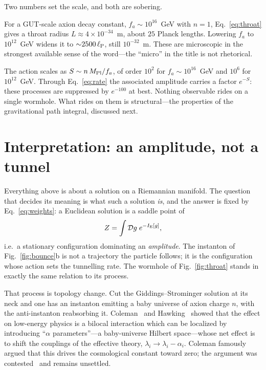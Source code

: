 \documentclass[twocolumn,floatfix,aps,prd,nofootinbib]{revtex4-2}
\begin{document}
Two numbers set the scale, and both are sobering.

For a GUT-scale axion decay constant, $f_a\sim10^{16}$~GeV with $n=1$, Eq.~\eqref{eq:throat} gives a throat radius $L\approx4\times10^{-34}$~m, about $25$ Planck lengths. Lowering $f_a$ to $10^{12}$~GeV widens it to ${\sim}2500\,\ell_{\rm P}$, still $10^{-32}$~m. These are microscopic in the strongest available sense of the word---the ``micro'' in the title is not rhetorical.

The action scales as $S\sim n\,M_{\rm Pl}/f_a$, of order $10^2$ for $f_a\sim10^{16}$~GeV and $10^6$ for $10^{12}$~GeV. Through Eq.~\eqref{eq:rate} the associated amplitude carries a factor $e^{-S}$: these processes are suppressed by $e^{-100}$ at best. Nothing observable rides on a single wormhole. What rides on them is structural---the properties of the gravitational path integral, discussed next.

\section{Interpretation: an amplitude, not a tunnel}
\label{sec:interpretation}

Everything above is about a solution on a Riemannian manifold. The question that decides its meaning is what such a solution \emph{is}, and the answer is fixed by Eq.~\eqref{eq:weights}: a Euclidean solution is a saddle point of
\begin{equation}
Z=\int\mathcal{D}g\;e^{-I_{\rm E}[g]} ,
\label{eq:pathintegral}
\end{equation}
i.e.\ a stationary configuration dominating an \emph{amplitude}. The instanton of Fig.~\ref{fig:bounce}b is not a trajectory the particle follows; it is the configuration whose action sets the tunnelling rate. The wormhole of Fig.~\ref{fig:throat} stands in exactly the same relation to its process.

That process is topology change. Cut the Giddings--Strominger solution at its neck and one has an instanton emitting a baby universe of axion charge $n$, with the anti-instanton reabsorbing it. Coleman~\cite{coleman1988} and Hawking~\cite{hawking1988} showed that the effect on low-energy physics is a bilocal interaction which can be localized by introducing ``$\alpha$ parameters''---a baby-universe Hilbert space---whose net effect is to shift the couplings of the effective theory, $\lambda_i\to\lambda_i-\alpha_i$. Coleman famously argued that this drives the cosmological constant toward zero; the argument was contested~\cite{fischler1989,polchinski1989} and remains unsettled.
\end{document}
